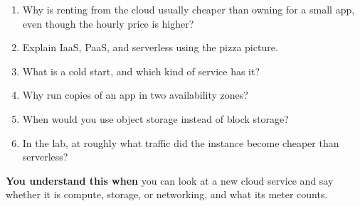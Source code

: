 \begin{enumerate}
\def\labelenumi{\arabic{enumi}.}
\tightlist
\item
  Why is renting from the cloud usually cheaper than owning for a small app, even though the hourly price is higher?
\item
  Explain IaaS, PaaS, and serverless using the pizza picture.
\item
  What is a cold start, and which kind of service has it?
\item
  Why run copies of an app in two availability zones?
\item
  When would you use object storage instead of block storage?
\item
  In the lab, at roughly what traffic did the instance become cheaper than serverless?
\end{enumerate}

\begin{understandbox}

\textbf{You understand this when} you can look at a new cloud service and say whether it is compute, storage, or networking, and what its meter counts.

\end{understandbox}
